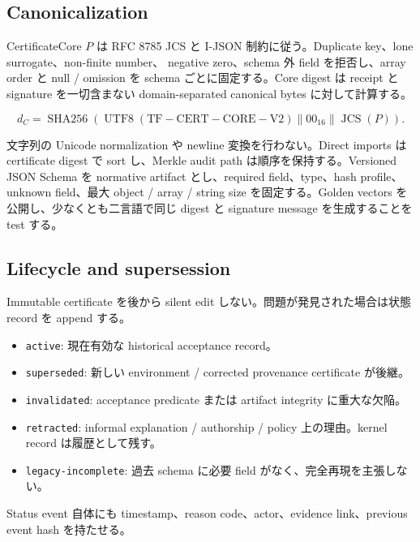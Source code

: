 \documentclass[a4paper,11pt]{ltjsarticle}
\begin{document}
\subsection{Canonicalization}

CertificateCore $P$ は RFC 8785 JCS と I-JSON 制約に従う。Duplicate key、lone surrogate、non-finite number、
negative zero、schema 外 field を拒否し、array order と null / omission を schema ごとに固定する。Core digest は
receipt と signature を一切含まない domain-separated canonical bytes に対して計算する。

\begin{equation}
  d_C = \operatorname{SHA256}(\operatorname{UTF8}(\mathrm{TF\!\! -\! CERT\!\! -\! CORE\!\! -\! V2})\parallel 00_{16}\parallel\operatorname{JCS}(P)).
\end{equation}

文字列の Unicode normalization や newline 変換を行わない。Direct imports は certificate digest で sort し、Merkle
audit path は順序を保持する。Versioned JSON Schema を normative artifact とし、required field、type、hash profile、
unknown field、最大 object / array / string size を固定する。Golden vectors を公開し、少なくとも二言語で同じ digest
と signature message を生成することを test する。

\subsection{Lifecycle and supersession}

Immutable certificate を後から silent edit しない。問題が発見された場合は状態 record を append する。

\begin{itemize}
  \item \texttt{active}: 現在有効な historical acceptance record。
  \item \texttt{superseded}: 新しい environment / corrected provenance certificate が後継。
  \item \texttt{invalidated}: acceptance predicate または artifact integrity に重大な欠陥。
  \item \texttt{retracted}: informal explanation / authorship / policy 上の理由。kernel record は履歴として残す。
  \item \texttt{legacy-incomplete}: 過去 schema に必要 field がなく、完全再現を主張しない。
\end{itemize}

Status event 自体にも timestamp、reason code、actor、evidence link、previous event hash を持たせる。
\end{document}
